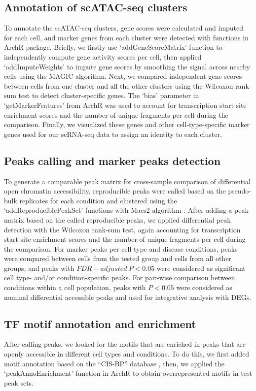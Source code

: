 \documentclass{book}
\begin{document}
\begin{refsection}
\subsection*{Annotation of scATAC-seq clusters}
To annotate the scATAC-seq clusters, gene scores were calculated and imputed for each cell, and marker genes from each cluster were detected with functions in ArchR package.
Briefly, we firstly use ‘addGeneScoreMatrix’ function to independently compute gene activity scores per cell, then applied ‘addImputeWeights’ to impute gene scores by smoothing the signal across nearby cells using the MAGIC algorithm.
Next, we compared independent gene scores between cells from one cluster and all the other clusters using the Wilcoxon rank-sum test to detect cluster-specific genes.
The ‘bias’ parameter in ‘getMarkerFeatures’ from ArchR was used to account for transcription start site enrichment scores and the number of unique fragments per cell during the comparison.
Finally, we visualized these genes and other cell-type-specific marker genes used for our scRNA-seq data to assign an identity to each cluster.
 
\subsection*{Peaks calling and marker peaks detection}
To generate a comparable peak matrix for cross-sample comparison of differential open chromatin accessibility, reproducible peaks were called based on the pseudo-bulk replicates for each condition and clustered using the ‘addReproduciblePeakSet’ functions with Macs2 algorithm \cite{Zhang2008Model}.
After adding a peak matrix based on the called reproducible peaks, we applied differential peak detection with the Wilcoxon rank-sum test, again accounting for transcription start site enrichment scores and the number of unique fragments per cell during the comparison.
For marker peaks per cell type and disease conditions, peaks were compared between cells from the tested group and cells from all other groups, and peaks with $FDR-adjusted~P < 0.05$ were considered as significant cell type- and/or condition-specific peaks.
For pair-wise comparison between conditions within a cell population, peaks with $P < 0.05$ were considered as nominal differential accessible peaks and used for integrative analysis with DEGs.

\subsection*{TF motif annotation and enrichment}
After calling peaks, we looked for the motifs that are enriched in peaks that are openly accessible in different cell types and conditions.
To do this, we first added motif annotation based on the “CIS-BP” database \cite{Weirauch2014Determination}, then, we applied the ‘peakAnnoEnrichment’ function in ArchR to obtain overrepresented motifs in test peak sets.
 

\end{refsection}
\end{document}

